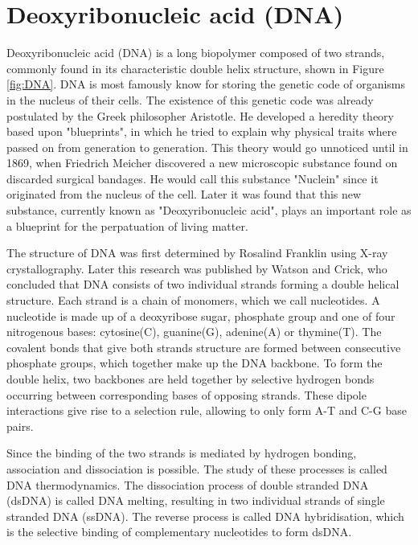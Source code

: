 \section{Deoxyribonucleic acid (DNA)}


Deoxyribonucleic acid (DNA) is a long biopolymer composed of two strands, commonly found
in its characteristic double helix structure, shown in Figure \ref{fig:DNA}. DNA is most
famously know for storing the
genetic code of organisms in the nucleus of their cells. The existence of this genetic
code was already
postulated by the Greek philosopher Aristotle. He developed a heredity theory based
upon "blueprints", in which he tried to explain why physical traits where passed on from
generation to generation. This theory would go unnoticed until in 1869, when
Friedrich Meicher discovered a new microscopic substance found on discarded
surgical bandages.\cite{Miescher1871} He would call this substance "Nuclein" since it
originated from the nucleus of the cell. Later it was found that this new substance,
currently known as "Deoxyribonucleic acid", plays an important role as a blueprint for
the perpatuation of living matter.\cite{Avery1944}

The structure of DNA was first determined by Rosalind Franklin using X-ray
crystallography. Later this research was published by Watson and Crick, who concluded
that DNA consists of two individual strands forming a double helical
structure.\cite{WATSON1953} Each strand is a chain of monomers, which we call
nucleotides. A nucleotide is made up of a
deoxyribose sugar, phosphate group and one of four nitrogenous bases: cytosine(C),
guanine(G), adenine(A) or thymine(T). The covalent bonds that give both strands structure
are formed between consecutive phosphate groups, which together make up the DNA backbone.
To form the double helix, two backbones are held together by
selective hydrogen bonds occurring between corresponding bases of opposing strands. These
dipole interactions give rise to a selection rule, allowing to only form A-T and C-G base
pairs.

Since the binding of the two strands is mediated by hydrogen bonding, association and
dissociation is possible. The study of these processes is called DNA thermodynamics. The
dissociation process of double stranded DNA (dsDNA) is called DNA melting, resulting in
two individual strands of single stranded DNA (ssDNA). The reverse process is called DNA
hybridisation, which is the selective binding of complementary nucleotides to form dsDNA.

